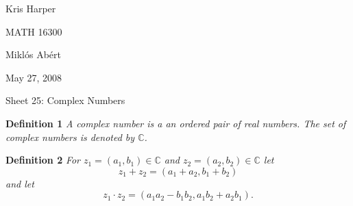 \documentclass{article}
\begin{document}
\newpage

\begin{flushright}
Kris Harper

MATH 16300

Mikl\'{o}s Ab\'{e}rt

May 27, 2008
\end{flushright}

\begin{flushleft}

\Large

Sheet 25: Complex Numbers\newline

\normalsize

\textbf{Definition 1}
\textsl{A complex number is a an ordered pair of real numbers. The set of complex numbers is denoted by $\mathbb{C}$.}\newline

\textbf{Definition 2}
\textsl{For $z_1 = (a_1,b_1) \in \mathbb{C}$ and $z_2 = (a_2,b_2) \in \mathbb{C}$ let
\[
z_1 + z_2 = (a_1 + a_2, b_1 + b_2)
\]
and let
\[
z_1 \cdot z_2 = (a_1a_2 - b_1b_2, a_1b_2 + a_2b_1).
\]}\newline


\end{flushleft}
\end{document}
